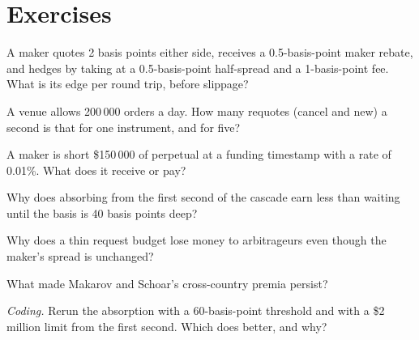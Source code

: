 \section{Exercises}

\begin{exercise}[$\star$]\label{exo:hf:crypto-high-frequency-trading-on-centralised-venues:1}
A maker quotes 2 basis points either side, receives a 0.5-basis-point maker rebate, and hedges by taking at a 0.5-basis-point half-spread and a
1-basis-point fee. What is its edge per round trip, before slippage?
\end{exercise}

\begin{exercise}[$\star$]\label{exo:hf:crypto-high-frequency-trading-on-centralised-venues:2}
A venue allows 200\,000 orders a day. How many requotes (cancel and new) a second is that for one instrument, and for five?
\end{exercise}

\begin{exercise}[$\star$]\label{exo:hf:crypto-high-frequency-trading-on-centralised-venues:3}
A maker is short \$150\,000 of perpetual at a funding timestamp with a rate of 0.01\%. What does it receive or pay?
\end{exercise}

\begin{exercise}[$\star\star$]\label{exo:hf:crypto-high-frequency-trading-on-centralised-venues:4}
Why does absorbing from the first second of the cascade earn less than waiting until the basis is 40 basis points deep?
\end{exercise}

\begin{exercise}[$\star\star$]\label{exo:hf:crypto-high-frequency-trading-on-centralised-venues:5}
Why does a thin request budget lose money to arbitrageurs even though the maker's spread is unchanged?
\end{exercise}

\begin{exercise}[$\star\star$]\label{exo:hf:crypto-high-frequency-trading-on-centralised-venues:6}
What made Makarov and Schoar's cross-country premia persist?
\end{exercise}

\begin{exercise}[$\star\star\star$]\label{exo:hf:crypto-high-frequency-trading-on-centralised-venues:7}
\emph{Coding.} Rerun the absorption with a 60-basis-point threshold and with a \$2 million limit from the first second. Which does better, and why?
\end{exercise}

